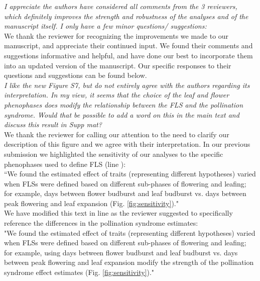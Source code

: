 \documentclass{article}[11pt]
\begin{document}
\setlength\parindent{0pt}

\textit{I appreciate the authors have considered all comments from the 3 reviewers, which definitely improves the strength and robustness of the analyses and of the manuscript itself. I only have a few minor questions/ suggestions:}\\

We thank the reviewer for recognizing the improvements we made to our manuscript, and appreciate their continued input. We found their comments and suggestions informative and helpful, and have done our best to incorporate them into an updated version of the manuscript. Our specific responses to their questions and suggestions can be found below.\\

\textit{I like the new Figure S7, but do not entirely agree with the authors regarding its interpretation. In my view, it seems that the choice of the leaf and flower phenophases does modify the relationship between the FLS and the pollination syndrome. Would that be possible to add a word on this in the main text and discuss this result in Supp mat?}\\

We thank the reviewer for calling our attention to the need to clarify our description of this figure and we agree with their interpretation. In our previous submission we highlighted the sensitivity of our analyses to the specific phenophases used to define FLS (line ):\\

``We found the estimated effect of traits (representing different hypotheses) varied when FLSs were defined based on different sub-phases of flowering and leafing; for example, days between flower budburst and leaf budburst vs. days between peak flowering and leaf expansion (Fig. \ref{fig:sensitivity})."\\ 

We have modified this text in line  as the reviewer suggested to specifically reference the differences in the pollination syndrome estimates:\\

"We found the estimated effect of traits (representing different hypotheses) varied when FLSs were defined based on different sub-phases of flowering and leafing; for example, using days between flower budburst and leaf budburst vs. days between peak flowering and leaf expansion modify the strength of the pollination syndrome effect estimates (Fig. \ref{fig:sensitivity})." \\
\end{document}
